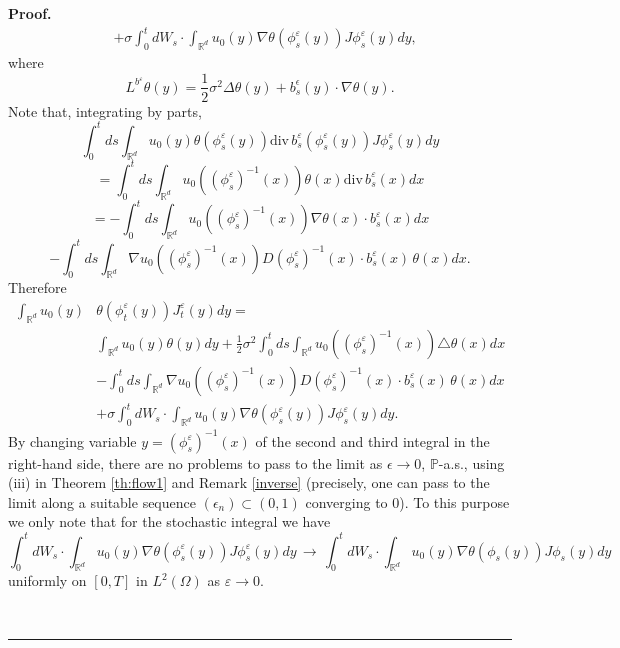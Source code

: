 \documentclass{article}
\newenvironment{proof}[1][Proof]{\noindent\textbf{#1.} }{\ \rule{0.5em}{0.5em}}
\begin{document}
\begin{proof}
\begin{equation}
\begin{split}
&  +\sigma\int_{0}^{t}dW_{s}\cdot\int_{{\mathbb{R}}^{d}}u_{0}(y)\nabla
\theta(\phi_{s}^{\varepsilon}(y))J\phi_{s}^{\varepsilon}(y)dy,
\end{split}
\end{equation}
where
\[
L^{b^{\varepsilon}} \theta(y) = \frac{1}{2}\sigma^{2} \Delta\theta
(y)+b^{\epsilon}_{s}(y)\cdot\nabla\theta(y).
\]
Note that, integrating by parts,
\[
\int_{0}^{t}ds\int_{{\mathbb{R}}^{d}}u_{0}(y) \theta(\phi_{s}^{\varepsilon
}(y)){\mathrm{div}\, }b^{\varepsilon}_{s} (\phi_{s}^{\varepsilon}(y))J
\phi_{s}^{\varepsilon}(y)dy
\]
\[
= \int_{0}^{t}ds\int_{{\mathbb{R}}^{d}}u_{0}((\phi_{s}^{\varepsilon})^{-1}(x)
) \theta(x){\mathrm{div}\, }b^{\varepsilon}_{s} (x) dx
\]
\[
= - \int_{0}^{t}ds\int_{{\mathbb{R}}^{d}}u_{0} ((\phi_{s}^{\varepsilon}%
)^{-1}(x) ) \nabla\theta(x)\cdot b^{\varepsilon}_{s} (x) dx
\]
\[
- \int_{0}^{t}ds\int_{{\mathbb{R}}^{d}} \nabla u_{0}((\phi_{s}^{\varepsilon
})^{-1}(x) ) D (\phi_{s}^{\varepsilon})^{-1}(x) \cdot b^{\varepsilon}_{s} (x)
\, \theta(x) dx.
\]
Therefore
\[
\begin{split}
\int_{{\mathbb{R}}^{d}}u_{0}(y) & \theta(\phi_{t}^{\varepsilon}(y))J_{t}%
^{\varepsilon}(y)dy = \\
& \int_{{\mathbb{R}}^{d}}u_{ 0}(y )\theta(y)dy+ \frac{1}{2}\sigma^{2}\int%
_{0}^{t}ds \int_{{\mathbb{R} }^{d}}u_{0}(( \phi_{s}^{\varepsilon})^{-1}(x) )
\triangle\theta(x) dx\\
& - \int_{0}^{t}ds\int_{{\mathbb{R}}^{d}} \nabla u_{0}((\phi_{s}^{\varepsilon
})^{-1}(x) ) D (\phi_{s}^{\varepsilon})^{-1}(x) \cdot b^{\varepsilon}_{s} (x)
\, \theta(x) dx\\
& +\sigma\int_{0}^{t}dW_{s}\cdot\int_{{\mathbb{R}}^{d}}u_{0}(y)\nabla\theta
(\phi_{s}^{\varepsilon}(y))J\phi_{s}^{\varepsilon}(y)dy.
\end{split}
\]
By changing variable $y = ( \phi_{s}^{\varepsilon})^{-1}(x)$ of the second and
third integral in the right-hand side, there are no problems to pass to the
limit as $\epsilon\to0$, $\mathbb{P}$-a.s., using (iii) in Theorem
\ref{th:flow1} and Remark  \ref{inverse} (precisely, one can pass to the limit
along a suitable sequence $(\epsilon_{n}) \subset(0,1)$ converging to 0).
To this purpose we only note that for the stochastic integral we have
\[
\int_{0}^{t}dW_{s}\cdot\int_{{\mathbb{R}}^{d}}u_{0}(y)\nabla\theta(\phi
_{s}^{\varepsilon}(y))J \phi_{s}^{\varepsilon}(y)dy \, \to\,  \int_{0}%
^{t}dW_{s}\cdot\int_{{\mathbb{R}}^{d}}u_{0}(y)\nabla\theta(\phi_{s}(y))J
\phi_{s}(y)dy
\]
uniformly on $[0,T]$ in $L^{2} (\Omega)$ as $\varepsilon\to0$.

\end{proof}
\end{document}
